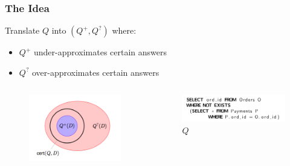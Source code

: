 \documentclass{beamer}
\begin{document}
		\begin{frame}
			\frametitle{The Idea}
			Translate $Q$ into   $(Q^+, Q^?)$   where:
			\begin{itemize}
				\item $Q^+$ under-approximates certain answers
				\item $Q^?$ over-approximates certain answers
			\end{itemize}
			\begin{columns}
				\begin{column}{0.52\textwidth}
					\begin{figure}
						\includegraphics[scale=0.5]{slide11}
					\end{figure}
				\end{column}
				\begin{column}{0.52\textwidth}
					\begin{figure}
						\includegraphics[scale=0.42]{q}
						\caption{$Q$}
					\end{figure}
				\end{column}
			\end{columns}
		\end{frame}
		
\end{document}
